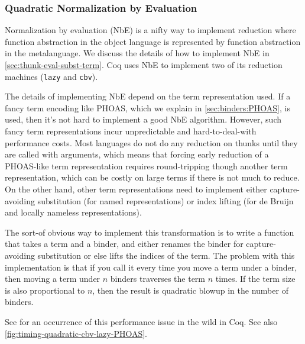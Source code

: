 \subsubsection{Quadratic Normalization by Evaluation} \label{sec:perf:quadratic-NbE} \label{sec:perf:quadratic-cbv}
Normalization by evaluation (NbE) is a nifty way to implement reduction where function abstraction in the object language is represented by function abstraction in the metalanguage.
We discuss the details of how to implement NbE in \autoref{sec:thunk-eval-subst-term}.
Coq uses NbE to implement two of its reduction machines (\texttt{lazy} and \texttt{cbv}).

The details of implementing NbE depend on the term representation used.
If a fancy term encoding like PHOAS, which we explain in \autoref{sec:binders:PHOAS}, is used, then it's not hard to implement a good NbE algorithm.
However, such fancy term representations incur unpredictable and hard-to-deal-with performance costs.
Most languages do not do any reduction on thunks until they are called with arguments, which means that forcing early reduction of a PHOAS-like term representation requires round-tripping though another term representation, which can be costly on large terms if there is not much to reduce.
On the other hand, other term representations need to implement either capture-avoiding substitution (for named representations) or index lifting (for de Bruijn and locally nameless representations).

The sort-of obvious way to implement this transformation is to write a function that takes a term and a binder, and either renames the binder for capture-avoiding substitution or else lifts the indices of the term.
The problem with this implementation is that if you call it every time you move a term under a binder, then moving a term under $n$ binders traverses the term $n$ times.
If the term size is also proportional to $n$, then the result is quadratic blowup in the number of binders.

See  for an occurrence of this performance issue in the wild in Coq.
See also \autoref{fig:timing-quadratic-cbv-lazy-PHOAS}.


